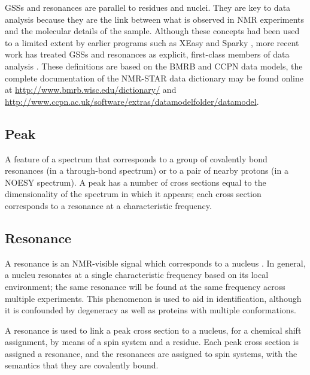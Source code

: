 GSSs \cite{saga, ezassign, pistachio, autoassign1997, autoassign2001}
and resonances \cite{ccpn} are parallel to residues and nuclei.
They are key to data analysis because they are the link between what is 
observed in NMR experiments and the molecular details of the sample.
Although these concepts had been used to a limited extent by earlier programs
such as XEasy and Sparky \cite{xeasy, sparky}, more recent work has treated 
GSSs and resonances as explicit, first-class members of data analysis 
\cite{ccpn, bmrb}.  These definitions are based on the BMRB and CCPN data models,
the complete documentation of the NMR-STAR data dictionary may be found online 
at \url{http://www.bmrb.wisc.edu/dictionary/} and
\url{http://www.ccpn.ac.uk/software/extras/datamodelfolder/datamodel}.

\subsection*{Peak}
A feature of a spectrum that corresponds to a group of covalently bond
resonances (in a through-bond spectrum) or to a pair of nearby protons
(in a NOESY spectrum).  A peak has a number of cross sections equal to
the dimensionality of the spectrum in which it appears; each cross section
corresponds to a resonance at a characteristic frequency.

\subsection*{Resonance}
A resonance is an NMR-visible signal which corresponds to a nucleus \cite{ccpn}.
In general, a nucleu resonates at a single characteristic frequency based
on its local environment;  the same resonance will be found at the same 
frequency across multiple experiments.  This phenomenon is used to aid in 
identification, although it is confounded by degeneracy as well as proteins
with multiple conformations.

A resonance is used to link a peak cross section to a nucleus, for a chemical 
shift assignment, by means of a spin system and a residue.  Each peak cross 
section is assigned a resonance, and the resonances are assigned to spin 
systems, with the semantics that they are covalently bound.

